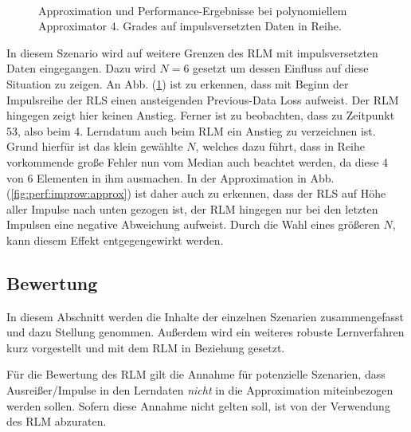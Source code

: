 \documentclass[a4paper, 12pt]{article}
\begin{document}
{\begin{figure}[H]
\begin{subfigure}[b]{0.4\textwidth}
                \caption{}
                \label{fig:perf:improw:perf}
        \end{subfigure}
        \\
        \caption{Approximation und Performance-Ergebnisse bei polynomiellem Approximator 4. Grades auf impulsversetzten Daten in Reihe.}
        \label{fig:perf:improw}
\end{figure}
In diesem Szenario wird auf weitere Grenzen des RLM mit impulsversetzten Daten eingegangen. Dazu wird $N = 6$ gesetzt um dessen Einfluss auf diese Situation zu zeigen.
An Abb. (\ref{fig:perf:improw:perf}) ist zu erkennen, dass mit Beginn der Impulsreihe der RLS einen ansteigenden Previous-Data Loss aufweist. Der RLM hingegen zeigt hier keinen Anstieg. Ferner ist zu beobachten, dass zu Zeitpunkt 53, also beim 4. Lerndatum auch beim RLM ein Anstieg zu verzeichnen ist. Grund hierfür ist das klein gewählte $N$, welches dazu führt, dass in Reihe vorkommende große Fehler nun vom Median auch beachtet werden, da diese 4 von 6 Elementen in ihm ausmachen.
In der Approximation in Abb. (\ref{fig:perf:improw:approx}) ist daher auch zu erkennen, dass der RLS auf Höhe aller Impulse nach unten gezogen ist, der RLM hingegen nur bei den letzten Impulsen eine negative Abweichung aufweist.
Durch die Wahl eines größeren $N$, kann diesem Effekt entgegengewirkt werden.

\subsection{Bewertung}
\label{sec:perf:bewertung}
In diesem Abschnitt werden die Inhalte der einzelnen Szenarien zusammengefasst und dazu Stellung genommen. Außerdem wird ein weiteres robuste Lernverfahren kurz vorgestellt und mit dem RLM in Beziehung gesetzt.

Für die Bewertung des RLM gilt die Annahme für potenzielle Szenarien, dass Ausreißer/Impulse in den Lerndaten \emph{nicht} in die Approximation miteinbezogen werden sollen. Sofern diese Annahme nicht gelten soll, ist von der Verwendung des RLM abzuraten.

}
\end{document}
